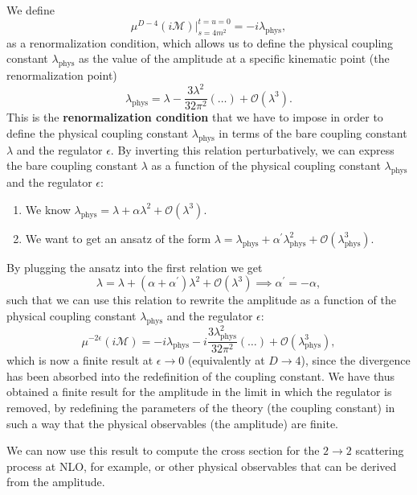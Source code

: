 We define
\[
    \mu^{D-4} (i \mathcal{M}) \bigg\vert_{s=4 m^2}^{t=u=0} = - i \lambda_{\text{phys}},
\]
as a renormalization condition, which allows us to define the physical coupling constant \(\lambda_{\text{phys}}\) as the value of the amplitude at a specific kinematic point (the renormalization point)
\[
    \lambda_{\text{phys}} = \lambda - \frac{3 \lambda^2}{32 \pi^2} \left(\dots  \right) + \mathcal{O}(\lambda^3).
\]
This is the \textbf{renormalization condition} that we have to impose in order to define the physical coupling constant \(\lambda_{\text{phys}}\) in terms of the bare coupling constant \(\lambda\) and the regulator \(\epsilon\). By inverting this relation perturbatively, we can express the bare coupling constant \(\lambda\) as a function of the physical coupling constant \(\lambda_{\text{phys}}\) and the regulator \(\epsilon\):
\begin{enumerate}
    \item We know \(\lambda_{\text{phys}} = \lambda + \alpha \lambda^2 + \mathcal{O}(\lambda^3)\).
    \item We want to get an ansatz of the form \(\lambda = \lambda_{\text{phys}} + \alpha^{\prime} \lambda_{\text{phys}}^2 + \mathcal{O}(\lambda_{\text{phys}}^3)\).
\end{enumerate}
By plugging the ansatz into the first relation we get
\[
    \lambda = \lambda + (\alpha + \alpha^{\prime}) \lambda^2 + \mathcal{O}(\lambda^3) \implies \alpha^{\prime} = - \alpha,
\]
such that we can use this relation to rewrite the amplitude as a function of the physical coupling constant \(\lambda_{\text{phys}}\) and the regulator \(\epsilon\):
\[
    \mu^{-2\epsilon} (i \mathcal{M}) = - i \lambda_{\text{phys}} - i \frac{3 \lambda_{\text{phys}}^2}{32 \pi^2} \left( \dots \right) + \mathcal{O}(\lambda_{\text{phys}}^3),
\]
which is now a finite result at \(\epsilon \to 0\) (equivalently at \(D \to 4\)), since the divergence has been absorbed into the redefinition of the coupling constant. We have thus obtained a finite result for the amplitude in the limit in which the regulator is removed, by redefining the parameters of the theory (the coupling constant) in such a way that the physical observables (the amplitude) are finite.

We can now use this result to compute the cross section for the \(2 \to 2\) scattering process at NLO, for example, or other physical observables that can be derived from the amplitude.

